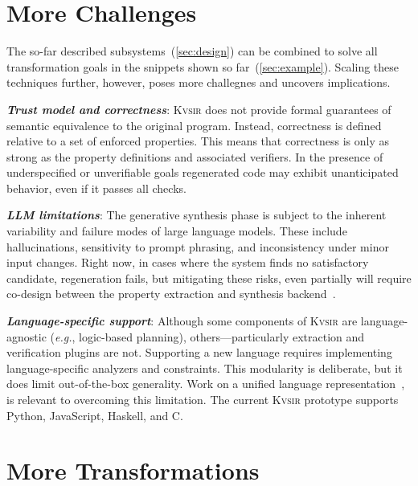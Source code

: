 \documentclass[sigplan,review,anonymous,10pt]{acmart}
\def\eg{{\em e.g.}, }
\newcommand{\sys}{{\scshape Kv{\textalpha}sir}\xspace}
\newcommand{\heading}[1]{\vspace{2pt}\noindent\textbf{\emph{#1}}:\enspace}
\begin{document}


\section{More Challenges}
\label{sec:limitations}

The so-far 
described subsystems~(\cref{sec:design}) can be combined to solve all transformation
goals in the snippets shown so far~(\cref{sec:example}).
Scaling these techniques further, however, poses more challegnes and uncovers implications.


\heading{Trust model and correctness}
\sys
does not provide formal guarantees
of semantic equivalence
to the original program.
Instead,
correctness is defined relative to a set of enforced properties.
This means that correctness is only as strong as the property definitions and associated verifiers.
In the presence of underspecified or unverifiable goals
regenerated code
may exhibit unanticipated behavior,
even if it passes all checks. 

\heading{LLM limitations}
The generative synthesis phase
is subject to the inherent variability and failure modes
of large language models.
These include hallucinations,
sensitivity to prompt phrasing,
and inconsistency
under minor input changes.
Right now, in cases where the system finds no satisfactory candidate, regeneration fails,
but mitigating these risks, even partially will 
require co-design between the property extraction and synthesis backend~\cite{banerjee2025crane}.

\heading{Language-specific support}
Although some components of \sys are language-agnostic (\eg logic-based planning),
others---particularly extraction and verification plugins are not.
Supporting a new language
requires implementing language-specific analyzers and constraints.
This modularity is deliberate,
but it does limit out-of-the-box generality.
Work on a unified language representation~\cite{koppel2018onetool,bap2011,dillig2009sail},
is relevant to overcoming this limitation.
The current \sys prototype
supports Python, JavaScript, Haskell, and C. 



\section{More Transformations}
\label{sec:discussion}
\end{document}
